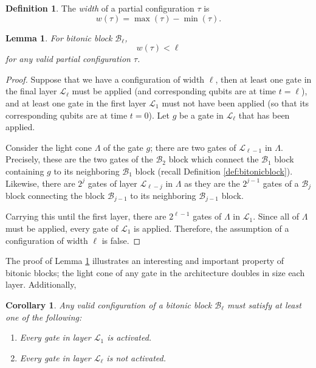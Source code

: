 \documentclass[11pt,letterpaper]{article}
\newtheorem{lemma}[theorem]{Lemma}
\newtheorem{corollary}[theorem]{Corollary}
\theoremstyle{definition}
\newtheorem{definition}[theorem]{Definition}
\theoremstyle{remark}
\newcommand{\cB}{\mathcal B}
\newcommand{\cL}{\mathcal L}
\numberwithin{equation}{section}
\theoremstyle{definition}
\begin{document}
\begin{definition}
The \emph{width} of a partial configuration $\tau$ is 
\begin{equation}
w(\tau) = \max(\tau) - \min(\tau).
\end{equation}
\end{definition}

\begin{lemma}
  For bitonic block $\cB_\ell$,
  \begin{equation}
    w(\tau)< \ell
  \end{equation}
  for any valid partial configuration $\tau$.
\label{lem:width}
\end{lemma}
\begin{proof}
  Suppose that we have a configuration of width $\ell$, then at least one gate in the final layer $\cL_\ell$ must be applied (and corresponding qubits are at time $t = \ell$), and at least one gate in the first layer $\cL_1$ must not have been applied (so that its corresponding qubits are at time $t=0$). Let $g$ be a gate in $\cL_\ell$ that has been applied. 

  Consider the light cone $\Lambda$ of the gate $g$; there are two gates of $\cL_{\ell - 1}$ in $\Lambda$. Precisely, these are the two gates of the $\cB_2$ block which connect the $\cB_1$ block containing $g$ to its neighboring $\cB_1$ block (recall Definition \ref{def:bitonicblock}). Likewise, there are $2^j$ gates of layer $\cL_{\ell - j}$ in $\Lambda$ as they are the $2^{j-1}$ gates of a $\cB_j$ block connecting the block $\cB_{j-1}$ to its neighboring $\cB_{j-1}$ block.

  Carrying this until the first layer, there are $2^{\ell-1}$ gates of $\Lambda$ in $\cL_1$. Since all of $\Lambda$ must be applied, every gate of $\cL_1$ is applied. Therefore, the assumption of a configuration of width $\ell$ is false.

\end{proof}

The proof of Lemma \ref{lem:width} illustrates an interesting and important property of bitonic blocks; the light cone of any gate in the architecture doubles in size each layer. Additionally,

\begin{corollary}
Any valid configuration of a bitonic block $\cB_\ell$ must satisfy at least one of the following:
\begin{enumerate}
\item Every gate in layer $\cL_1$ is activated.
\item Every gate in layer $\cL_\ell$ is \emph{not} activated.
\end{enumerate}
\label{cor:dictotomyofactivation}
\end{corollary}
%
\end{document}
